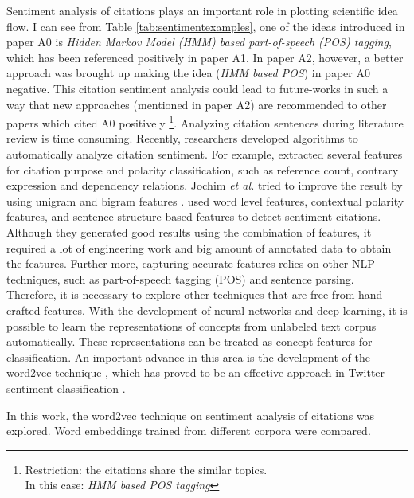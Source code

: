 \documentclass[11pt]{llncs}
\begin{document}
Sentiment analysis of citations plays an important role in plotting scientific idea flow. I can see from Table \ref{tab:sentimentexamples}, one of the ideas introduced in paper A0 is \textit{Hidden Markov Model (HMM) based part-of-speech (POS) tagging}, which has been referenced positively in paper A1. In paper A2, however, a better approach was brought up making the idea (\textit{HMM based POS}) in paper A0 negative. This citation sentiment analysis could lead to future-works in such a way that new approaches (mentioned in paper A2) are recommended to other papers which cited A0 positively \footnote{\footnotesize{Restriction: the citations share the similar topics.\\ In this case: \textit{HMM based POS tagging}}}. Analyzing citation sentences during literature review is time consuming. Recently, researchers developed algorithms to automatically analyze citation sentiment. For example, %
\cite{abu2013purpose} extracted several features for citation purpose and polarity classification, such as reference count, contrary expression and dependency relations. Jochim \textit{et al.} tried to improve the result by using unigram and bigram features \cite{jochim2014improving}. %
\cite{athar2011sentiment} used word level features, contextual polarity features, and sentence structure based features to detect sentiment citations. 
Although they generated good results using the combination of features, it required a lot of engineering work and big amount of annotated data to obtain the features. Further more, capturing accurate features relies on other NLP techniques, such as part-of-speech tagging (POS) and sentence parsing. Therefore, it is necessary to explore other techniques that are free from hand-crafted features. With the development of neural networks and deep learning, it is possible to learn the representations of concepts from unlabeled text corpus automatically. These representations can be treated as concept features for classification. An important advance in this area is the development of the word2vec technique \cite{mikolov2013efficient}, which has proved to be an effective approach in Twitter sentiment classification \cite{tang2014learning}. 

In this work, the word2vec technique on sentiment analysis of citations was explored. Word embeddings trained from different corpora were compared.
\end{document}
